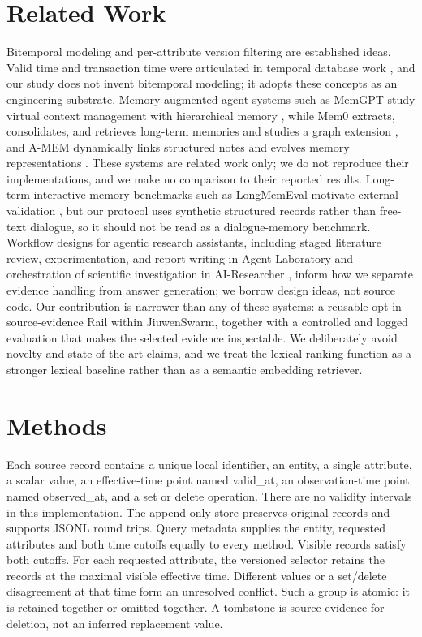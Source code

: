 \documentclass{article}
\begin{document}
\section{Related Work}
Bitemporal modeling and per-attribute version filtering are established ideas. Valid time and transaction time were articulated in temporal database work \citep{temporal}, and our study does not invent bitemporal modeling; it adopts these concepts as an engineering substrate. Memory-augmented agent systems such as MemGPT study virtual context management with hierarchical memory \citep{memgpt}, while Mem0 extracts, consolidates, and retrieves long-term memories and studies a graph extension \citep{memzero}, and A-MEM dynamically links structured notes and evolves memory representations \citep{amem}. These systems are related work only; we do not reproduce their implementations, and we make no comparison to their reported results. Long-term interactive memory benchmarks such as LongMemEval motivate external validation \citep{longmemeval}, but our protocol uses synthetic structured records rather than free-text dialogue, so it should not be read as a dialogue-memory benchmark. Workflow designs for agentic research assistants, including staged literature review, experimentation, and report writing in Agent Laboratory \citep{agentlab} and orchestration of scientific investigation in AI-Researcher \citep{airesearcher}, inform how we separate evidence handling from answer generation; we borrow design ideas, not source code. Our contribution is narrower than any of these systems: a reusable opt-in source-evidence Rail within JiuwenSwarm, together with a controlled and logged evaluation that makes the selected evidence inspectable. We deliberately avoid novelty and state-of-the-art claims, and we treat the lexical ranking function as a stronger lexical baseline rather than as a semantic embedding retriever.
\section{Methods}
Each source record contains a unique local identifier, an entity, a single attribute, a scalar value, an effective-time point named valid\_at, an observation-time point named observed\_at, and a set or delete operation. There are no validity intervals in this implementation. The append-only store preserves original records and supports JSONL round trips. Query metadata supplies the entity, requested attributes and both time cutoffs equally to every method. Visible records satisfy both cutoffs. For each requested attribute, the versioned selector retains the records at the maximal visible effective time. Different values or a set/delete disagreement at that time form an unresolved conflict. Such a group is atomic: it is retained together or omitted together. A tombstone is source evidence for deletion, not an inferred replacement value.
\end{document}
